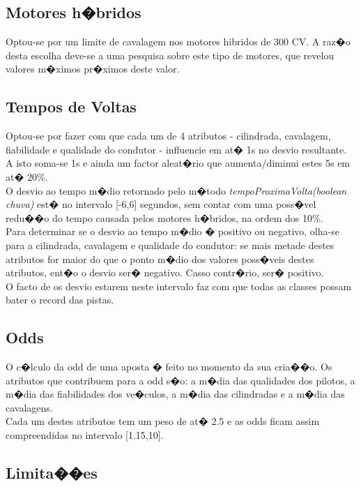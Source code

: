 \documentclass[10pt,notitlepage]{article}
\begin{document}
\subsection{Motores h�bridos}

Optou-se por um limite de cavalagem nos motores hibridos de 300 CV. A raz�o desta escolha deve-se a uma pesquisa sobre este tipo de motores, que revelou valores m�ximos pr�ximos deste valor.

\subsection{Tempos de Voltas}

Optou-se por fazer com que cada um de 4 atributos - cilindrada, cavalagem, fiabilidade e qualidade do condutor - influencie em at� 1s no desvio resultante. A isto soma-se 1s e ainda um factor aleat�rio que aumenta/diminui estes 5s em at� 20\%.\\

O desvio ao tempo m�dio retornado pelo m�todo \textit{tempoProximaVolta(boolean chuva)} est� no intervalo [-6,6] segundos, sem contar com uma poss�vel redu��o do tempo causada pelos motores h�bridos, na ordem dos 10\%.  \\

Para determinar se o desvio ao tempo m�dio � positivo ou negativo, olha-se para a cilindrada, cavalagem e qualidade do condutor: se mais metade destes atributos for maior do que o ponto m�dio dos valores poss�veis destes atributos, ent�o o desvio ser� negativo. Casso contr�rio, ser� positivo. \\

O facto de os desvio estarem neste intervalo faz com que todas as classes possam bater o record das pistas.

\newpage

\subsection{Odds}

O c�lculo da odd de uma aposta � feito no momento da sua cria��o. Os atributos que contribuem para a odd s�o: a m�dia das qualidades dos pilotos, a m�dia das fiabilidades dos ve�culos, a m�dia das cilindradas e a m�dia das cavalagens. \\

Cada um destes atributos tem um peso de at� 2.5 e as odds ficam assim compreendidas no intervalo [1.15,10].

\subsection{Limita��es}
\end{document}

